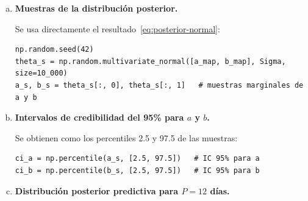 \documentclass[a4paper,11pt]{article}
\theoremstyle{remark}
\begin{document}
\begin{enumerate}[a)]
La expresión~\eqref{eq:forma-cuad} es exactamente el núcleo de una
distribución normal bivariada (cf.\ notas de clase).  
Por tanto:
\begin{equation}
  (a,b)\mid y \;\sim\; \mathcal{N}_2\!\bigl((\hat{a},\hat{b}),\,\Sigma\bigr),
  \label{eq:posterior-normal}
\end{equation}
donde $(\hat{a},\hat{b})$ es la solución de~\eqref{eq:sistema} (media
$=$ moda para una normal), la \textbf{matriz de precisión} es
\begin{equation}
  \Sigma^{-1}
  = \begin{bmatrix}A & B \\ B & C\end{bmatrix},
  \qquad
  \Sigma
  = \frac{1}{AC-B^2}\begin{bmatrix}C&-B\\-B&A\end{bmatrix}.
  \label{eq:cov}
\end{equation}

\begin{lstlisting}
A = n/sigma**2 + 1/100
B = sum_x/sigma**2
C = sum_x2/sigma**2 + 1/100

Prec  = np.array([[A, B], [B, C]])  # matriz de precision Sigma^{-1}
Sigma = np.linalg.inv(Prec)         # covarianza posterior
\end{lstlisting}

\item \textbf{Muestras de la distribución posterior.}

Se usa directamente el resultado~\eqref{eq:posterior-normal}:
\begin{lstlisting}
np.random.seed(42)
theta_s = np.random.multivariate_normal([a_map, b_map], Sigma, size=10_000)
a_s, b_s = theta_s[:, 0], theta_s[:, 1]   # muestras marginales de a y b
\end{lstlisting}

\item \textbf{Intervalos de credibilidad del 95\% para $a$ y $b$.}

Se obtienen como los percentiles 2.5 y 97.5 de las muestras:
\begin{lstlisting}
ci_a = np.percentile(a_s, [2.5, 97.5])   # IC 95% para a
ci_b = np.percentile(b_s, [2.5, 97.5])   # IC 95% para b
\end{lstlisting}

\item \textbf{Distribución posterior predictiva para $P = 12$ días.}


\end{enumerate}
\end{document}
